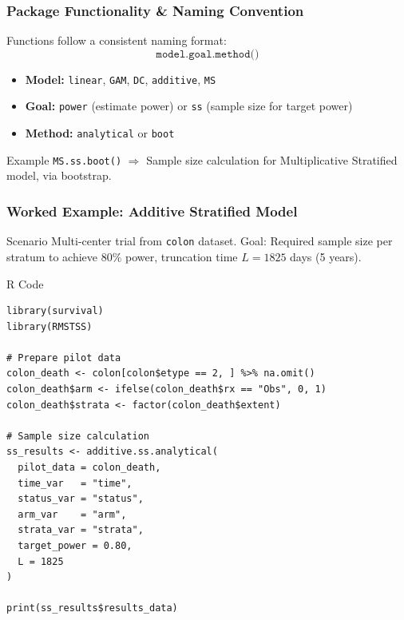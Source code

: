 \documentclass{beamer}
\begin{document}
\begin{frame}
\frametitle{Package Functionality \& Naming Convention}

Functions follow a consistent naming format:
\[
\texttt{model.goal.method()}
\]

\begin{itemize}
  \item \textbf{Model:} \texttt{linear}, \texttt{GAM}, \texttt{DC}, \texttt{additive}, \texttt{MS}
  \item \textbf{Goal:} \texttt{power} (estimate power) or \texttt{ss} (sample size for target power)
  \item \textbf{Method:} \texttt{analytical} or \texttt{boot}
\end{itemize}

\begin{block}{Example}
\texttt{MS.ss.boot()}  
$\Rightarrow$ Sample size calculation for Multiplicative Stratified model, via bootstrap.
\end{block}

\end{frame}

\begin{frame}[fragile]
\frametitle{Worked Example: Additive Stratified Model}

\begin{block}{Scenario}
Multi-center trial from \texttt{colon} dataset.  
Goal: Required sample size per stratum to achieve $80\%$ power, truncation time $L = 1825$ days (5 years).
\end{block}

\begin{block}{R Code}
\begin{verbatim}
library(survival)
library(RMSTSS)

# Prepare pilot data
colon_death <- colon[colon$etype == 2, ] %>% na.omit()
colon_death$arm <- ifelse(colon_death$rx == "Obs", 0, 1)
colon_death$strata <- factor(colon_death$extent)

# Sample size calculation
ss_results <- additive.ss.analytical(
  pilot_data = colon_death,
  time_var   = "time",
  status_var = "status",
  arm_var    = "arm",
  strata_var = "strata",
  target_power = 0.80,
  L = 1825
)

print(ss_results$results_data)
\end{verbatim}
\end{block}

\end{frame}
\end{document}
